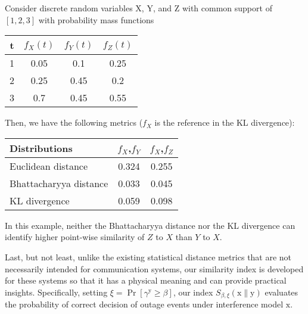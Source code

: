 \documentclass[12pt, draftclsnofoot, onecolumn]{IEEEtran}
\begin{document}
\begin{example}
Consider discrete random variables $\mathrm{X}$, $\mathrm{Y}$, and $\mathrm{Z}$ with common support of $[1,2,3]$ with probability mass functions

{\begin{table}[!h]
\centering
{
\renewcommand{\tabcolsep}{5pt}
\renewcommand{\arraystretch}{1}
\begin{tabular}{|c|c|c|c|}
  \hline
  t & $f_{X}(t)$ & $f_{Y}(t)$ & $f_{Z}(t)$ \\ \hline
  1 & 0.05 & 0.1 & 0.25 \\  \hline
  2 & 0.25 & 0.45 & 0.2 \\  \hline
  3 & 0.7 & 0.45 & 0.55 \\
  \hline
\end{tabular}
}
\end{table}}
\vspace{5mm}

Then, we have the following metrics ($f_{X}$ is the reference in the KL divergence):
{\begin{table}[!h]
\centering
{
\renewcommand{\tabcolsep}{5pt}
\renewcommand{\arraystretch}{1}
\begin{tabular}{|l|c|c|}
  \hline
  Distributions & $f_{X}$,$f_{Y}$ & $f_{X}$,$f_{Z}$ \\ \hline
  Euclidean distance & 0.324 & 0.255 \\  \hline
  Bhattacharyya distance & 0.033 & 0.045 \\  \hline
  KL divergence & 0.059 & 0.098 \\  \hline
\end{tabular}
}
\vspace{-7mm}
\end{table}
}
\linebreak
In this example, neither the Bhattacharyya distance nor the KL divergence can identify higher point-wise similarity of $Z$ to $X$ than $Y$ to $X$.
\end{example}

Last, but not least, unlike the existing statistical distance metrics that are not necessarily intended for communication systems, our similarity index is developed for these systems so that it has a physical meaning and can provide practical insights. Specifically, setting $\xi = \Pr \left[ \gamma^{\mathrm{y}} \geq \beta \right]$, our index $S_{\beta,\xi}\left(\mathrm{x}\|\mathrm{y} \right)$ evaluates the probability of correct decision of outage events under interference model $\mathrm{x}$.
\end{document}
